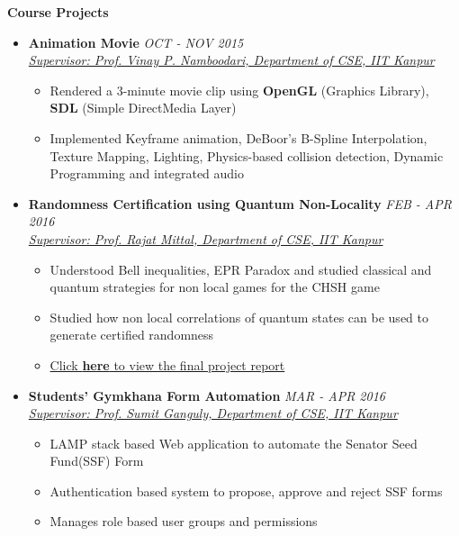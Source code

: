 \documentclass[letterpaper,11pt]{article}
\begin{document}
{\pagebreak

\Large{\textbf{Course Projects}}
\small
\begin{itemize}
    \item \textbf{Animation Movie} \hfill \textit{OCT - NOV 2015}\\
    \href{https://sites.google.com/site/vinaynamboodiri/}{\textit{Supervisor: Prof. Vinay P. Namboodari, Department of CSE, IIT Kanpur}}
    \begin{itemize}
        \item Rendered a 3-minute movie clip using \textbf{OpenGL} (Graphics Library), \textbf{SDL} (Simple DirectMedia Layer)
        \item Implemented Keyframe animation, DeBoor's B-Spline Interpolation, Texture Mapping, Lighting, Physics-based collision detection, Dynamic Programming and integrated audio
    \end{itemize}
    \item \textbf{Randomness Certification using Quantum Non-Locality} \hfill \textit{FEB - APR 2016}
        \\
        \href{http://www.cse.iitk.ac.in/users/rmittal/}{\textit{Supervisor: Prof. Rajat Mittal, Department of CSE, IIT Kanpur}}
        \begin{itemize}
            \item Understood Bell inequalities, EPR Paradox and studied classical and quantum strategies for non local games for the CHSH game
            \item Studied how non local correlations of quantum states can be used to generate certified randomness
            \item \href{http://home.iitk.ac.in/~kunalkap/Final_Project_Report_CS682.pdf}{Click \textbf{here} to view the final project report}
        \end{itemize}
    \item \textbf{Students' Gymkhana Form Automation} \hfill \textit{MAR - APR 2016}\\
        \href{http://www.cse.iitk.ac.in/users/sganguly/}{\textit{Supervisor: Prof. Sumit Ganguly, Department of CSE, IIT Kanpur}}
        \begin{itemize}
            \item LAMP stack based Web application to automate the Senator Seed Fund(SSF) Form
            \item Authentication based system to propose, approve and reject SSF forms
            \item Manages role based user groups and permissions
        \end{itemize}


\end{itemize}}
\end{document}
